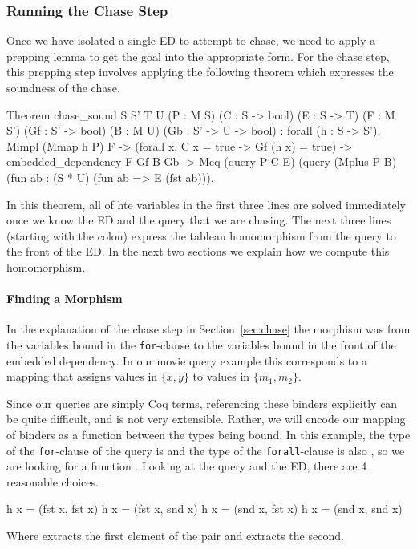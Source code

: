 \documentclass[preprint]{sigplanconf}
\begin{document}
\subsubsection{Running the Chase Step}
\label{sec:chase-step}

Once we have isolated a single ED to attempt to chase, we need to apply a prepping lemma to get the goal into the appropriate form.
For the chase step, this prepping step involves applying the following theorem which expresses the soundness of the chase.
\begin{coq}
Theorem chase_sound {S S' T U}
  (P : M S) (C : S -> bool) (E : S -> T)
  (F : M S') (Gf : S' -> bool) (B : M U) (Gb : S' -> U -> bool)
: forall (h : S -> S'),
    Mimpl (Mmap h P) F ->
    (forall x, C x = true -> Gf (h x) = true) ->
    embedded_dependency F Gf B Gb ->
    Meq (query P C E)
        (query (Mplus P B)
               (fun ab : (S * U)%
               (fun ab => E (fst ab))).
\end{coq}
In this theorem, all of hte variables in the first three lines are solved immediately once we know the ED and the query that we are chasing.
The next three lines (starting with the colon) express the tableau homomorphism from the query to the front of the ED.
In the next two sections we explain how we compute this homomorphism.

\paragraph{Finding a Morphism}
In the explanation of the chase step in Section~\ref{sec:chase} the morphism was from the variables bound in the {\tt for}-clause to the variables bound in the front of the embedded dependency.
In our movie query example this corresponds to a mapping that assigns values in $\{x,y\}$ to values in $\{m_1,m_2\}$.

Since our queries are simply Coq terms, referencing these binders explicitly can be quite difficult, and is not very extensible.
Rather, we will encode our mapping of binders as a function between the types being bound.
In this example, the type of the {\tt for}-clause of the query is  and the type of the {\tt forall}-clause is also , so we are looking for a function .
Looking at the query and the ED, there are 4 reasonable choices.
\begin{coq}
h x = (fst x, fst x)
h x = (fst x, snd x)
h x = (snd x, fst x)
h x = (snd x, snd x)
\end{coq}
Where  extracts the first element of the pair and  extracts the second.
\end{document}
